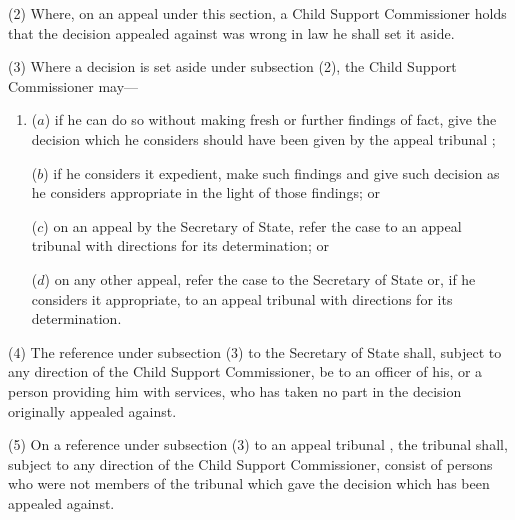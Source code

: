 \documentclass[12pt,a4paper]{article}
\begin{document}
(2) Where, on an appeal under this section, a Child Support Commissioner holds that the decision appealed against was wrong in law he shall set it aside.

(3) Where a decision is set aside under subsection (2), the Child Support Commissioner may—
\begin{enumerate}\item[]
($a$) if he can do so without making fresh or further findings of fact, give the decision which he considers should have been given by 
the appeal tribunal%
;

($b$) if he considers it expedient, make such findings and give such decision as he considers appropriate in the light of those findings; or


($c$) on an appeal by the Secretary of State, refer the case to 
an appeal tribunal  %
with directions for its determination; or

($d$) on any other appeal, refer the case to 
the Secretary of State  %
or, if he considers it appropriate, to 
an appeal tribunal  %
with directions for its determination.
\end{enumerate}


(4) The reference under subsection (3) to the Secretary of State shall, subject to any direction of the Child Support Commissioner, be to an officer of his, or a person providing him with services, who has taken no part in the decision originally appealed against.

(5) On a reference under subsection (3)  to 
an appeal tribunal%
, the tribunal shall, subject to any direction of the Child Support Commissioner, consist of persons who were not members of the tribunal which gave the decision which has been appealed against.
\end{document}
